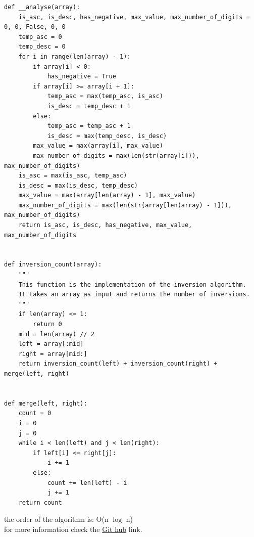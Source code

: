 \documentclass[
10pt, %
a4paper, %
oneside, %
headinclude,footinclude, %
BCOR5mm, %
]{scrartcl}
\begin{document}
\begin{lstlisting}
def __analyse(array):
    is_asc, is_desc, has_negative, max_value, max_number_of_digits = 0, 0, False, 0, 0
    temp_asc = 0
    temp_desc = 0
    for i in range(len(array) - 1):
        if array[i] < 0:
            has_negative = True
        if array[i] >= array[i + 1]:
            temp_asc = max(temp_asc, is_asc)
            is_desc = temp_desc + 1
        else:
            temp_asc = temp_asc + 1
            is_desc = max(temp_desc, is_desc)
        max_value = max(array[i], max_value)
        max_number_of_digits = max(len(str(array[i])), max_number_of_digits)
    is_asc = max(is_asc, temp_asc)
    is_desc = max(is_desc, temp_desc)
    max_value = max(array[len(array) - 1], max_value)
    max_number_of_digits = max(len(str(array[len(array) - 1])), max_number_of_digits)
    return is_asc, is_desc, has_negative, max_value, max_number_of_digits


def inversion_count(array):
    """
    This function is the implementation of the inversion algorithm.
    It takes an array as input and returns the number of inversions.
    """
    if len(array) <= 1:
        return 0
    mid = len(array) // 2
    left = array[:mid]
    right = array[mid:]
    return inversion_count(left) + inversion_count(right) + merge(left, right)


def merge(left, right):
    count = 0
    i = 0
    j = 0
    while i < len(left) and j < len(right):
        if left[i] <= right[j]:
            i += 1
        else:
            count += len(left) - i
            j += 1
    return count

\end{lstlisting}
the order of the algorithm is: O(n $\log$ n)
\\
for more information check the \href{https://github.com/prhdm/Best-sorting-algorithm}{Git hub} link.
\\
\end{document}
